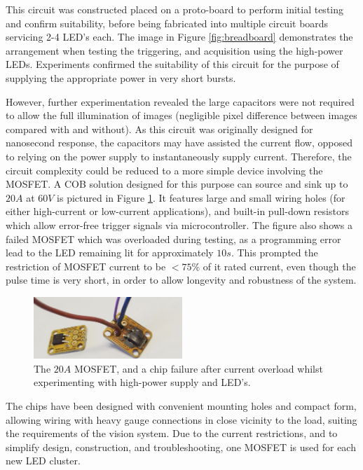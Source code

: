 \documentclass[fleqn,twoside,12pt]{report}
\begin{document}
This circuit was constructed placed on a proto-board to perform initial testing and confirm suitability, before being fabricated into multiple circuit boards servicing 2-4 LED's each. The image in Figure \ref{fig:breadboard} demonstrates the arrangement when testing the triggering, and acquisition using the high-power LEDs. Experiments confirmed the suitability of this circuit for the purpose of supplying the appropriate power in very short bursts. 

However, further experimentation revealed the large capacitors were not required to allow the full illumination of images (negligible pixel difference between images compared with and without). As this circuit was originally designed for nanosecond response, the capacitors may have assisted the current flow, opposed to relying on the power supply to instantaneously supply current. Therefore, the circuit complexity could be reduced to a more simple device involving the MOSFET. A COB solution designed for this purpose can source and sink up to $20A$ at $60V$ is pictured in Figure \ref{fig:mosfet}. It features large and small wiring holes (for either high-current or low-current applications), and built-in pull-down resistors which allow error-free trigger signals via microcontroller. The figure also shows a failed MOSFET which was overloaded during testing, as a programming error lead to the LED remaining lit for approximately $10s$. This prompted the restriction of MOSFET current to be $<75\%$ of it rated current, even though the pulse time is very short, in order to allow longevity and robustness of the system.


\begin{figure}
	\begin{center}
		\includegraphics[width=0.5\textwidth]{mosfet.png}
	\end{center}
	\caption{The $20A$ MOSFET, and a chip failure after current overload whilst experimenting with high-power supply and LED's.}
	\label{fig:mosfet}
\end{figure} 


The chips have been designed with convenient mounting holes and compact form, allowing wiring with heavy gauge connections in close vicinity to the load, suiting the requirements of the vision system. Due to the current restrictions, and to simplify design, construction, and troubleshooting, one MOSFET is used for each new LED cluster. 
\end{document}
